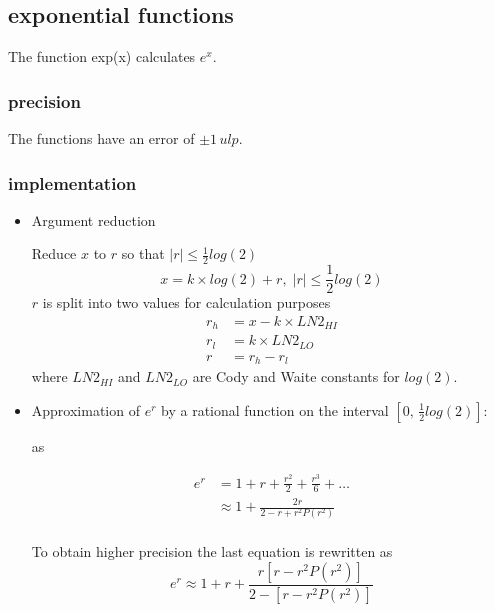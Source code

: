 \documentclass[10pt,a4paper,wide]{article}
\numberwithin{equation}{subsection}
\begin{document}
\subsection{exponential functions}
\label{sub_sec:exp}
The function exp(x) calculates $ e^x $.

\subsubsection{precision}
The functions have an error of $ \pm 1\, ulp$.

\subsubsection{implementation}
\begin{itemize}
\item Argument reduction

    Reduce $x$ to $r$ so that $ |r| \le \frac{1}{2} log(2) $
    \begin{equation}
        x = k \times log(2) + r, \; |r| \le \frac{1}{2} log(2)
    \end{equation}
    $r$ is split into two values for calculation purposes
    \[
       \begin{aligned}
       r_h &= x - k \times LN2_{HI} \\
       r_l &= k \times LN2_{LO} \\
       r &= r_h - r_l
       \end{aligned}
    \]
    where $LN2_{HI}$ and $LN2_{LO}$ are Cody and Waite constants for $log(2)$.

\item Approximation of $e^r$ by a rational function on the interval
    $[0,\,\frac{1}{2}log(2)]$:

    as

    \begin{equation}
        \begin{aligned}
            e^{r} &= 1 + r + \frac{r^2}{2} + \frac{r^3}{6} + \dots \\
                  &\approx  1 + \frac {2r} {2 -r + r^2 P(r^2)} \\
        \end{aligned}
    \end{equation}

    To obtain higher precision the last equation is rewritten as
    \begin{equation}
        e^{r} \approx  1 + r + \frac{r [r -r^2 P(r^2)]} {2-[r-r^2P(r^2)]}
    \end{equation}


\end{itemize}
\end{document}
